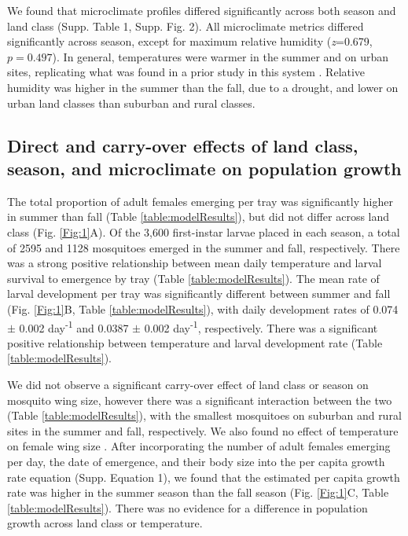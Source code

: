 \documentclass[12pt]{article}
\begin{document}
We found that microclimate profiles differed significantly across both season and land class (Supp. Table 1, Supp. Fig. 2). All microclimate metrics differed significantly across season, except for maximum relative humidity (\textit{z}=0.679, $p=0.497$). In general, temperatures were warmer in the summer and on urban sites, replicating what was found in a prior study in this system \citep{murdock2017}. Relative humidity was higher in the summer than the fall, due to a drought, and lower on urban land classes than suburban and rural classes.

\subsection{Direct and carry-over effects of land class, season, and microclimate on population growth}

The total proportion of adult females emerging per tray was significantly higher in summer than fall (Table \ref{table:modelResults}), but did not differ across land class (Fig. \ref{Fig:1}A). Of the 3,600 first-instar larvae placed in each season, a total of 2595 and 1128 mosquitoes emerged in the summer and fall, respectively. There was a strong positive relationship between mean daily temperature and larval survival to emergence by tray (Table \ref{table:modelResults}). The mean rate of larval development per tray was significantly different between summer and fall (Fig. \ref{Fig:1}B, Table \ref{table:modelResults}), with daily development rates of 0.074 $\pm$ 0.002 day\textsuperscript{-1} and 0.0387 $\pm$ 0.002 day\textsuperscript{-1}, respectively. There was a significant positive relationship between temperature and larval development rate (Table \ref{table:modelResults}).

We did not observe a significant carry-over effect of land class or season on mosquito wing size, however there was a significant interaction between the two (Table \ref{table:modelResults}), with the smallest mosquitoes on suburban and rural sites in the summer and fall, respectively. We also found no effect of temperature on female wing size . After incorporating the number of adult females emerging per day, the date of emergence, and their body size into the per capita growth rate equation (Supp. Equation 1), we found that the estimated per capita growth rate was higher in the summer season than the fall season (Fig. \ref{Fig:1}C, Table \ref{table:modelResults}). There was no evidence for a difference in population growth across land class or temperature.
\end{document}

